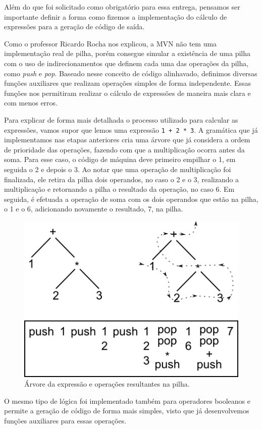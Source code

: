 \label{sec:expre}
Além do que foi solicitado como obrigatório para essa entrega, 
pensamos ser importante definir a forma como fizemos a implementação do 
cálculo de expressões para a geração de código de saída.

Como o professor Ricardo Rocha nos explicou, a MVN não tem uma implementação
real de pilha, porém consegue simular a existência de uma pilha com o uso de
indirecionamentos que definem cada uma das operações da pilha, como \emph{push}
e \emph{pop}. Baseado nesse conceito de código alinhavado, definimos diversas
funções auxiliares que realizam operações simples de forma independente. Essas
funções nos permitiram realizar o cálculo de expressões de maneira mais clara e
com menos erros.

Para explicar de forma mais detalhada o processo utilizado para calcular as
expressões, vamos supor que lemos uma expressão \verb=1 + 2 * 3=. A gramática
que já implementamos nas etapas anteriores cria uma árvore que já considera a
ordem de prioridade das operações, fazendo com que a multiplicação ocorra antes
da soma. Para esse caso, o código de máquina deve primeiro empilhar o 1, em
seguida o 2 e depois o 3. Ao notar que uma operação de multiplicação foi
finalizada, ele retira da pilha dois operandos, no caso o 2 e o 3, realizando a
multiplicação e retornando a pilha o resultado da operação, no caso 6. Em
seguida, é efetuada a operação de soma com os dois operandos que estão na
pilha, o 1 e o 6, adicionando novamente o resultado, 7, na pilha.

\begin{figure}[htbp]
    \centering
    \includegraphics[width=.6\textwidth]{./img/arith.png}
    \caption{Árvore da expressão e operações resultantes na pilha.}
    \label{figure:example}
\end{figure}

O mesmo tipo de lógica foi implementado também para operadores booleanos e
permite a geração de código de forma mais simples, visto que já desenvolvemos
funções auxiliares para essas operações.

